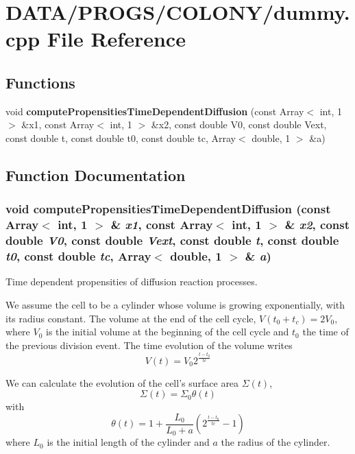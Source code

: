 \section{DATA/PROGS/COLONY/dummy.cpp File Reference}
\label{dummy_8cpp}
\subsection*{Functions}
\begin{CompactItemize}
\item 
void {\bf computePropensitiesTimeDependentDiffusion} (const Array$<$ int, 1 $>$ \&x1, const Array$<$ int, 1 $>$ \&x2, const double V0, const double Vext, const double t, const double t0, const double tc, Array$<$ double, 1 $>$ \&a)
\end{CompactItemize}


\subsection{Function Documentation}
\subsubsection{\setlength{\rightskip}{0pt plus 5cm}void computePropensitiesTimeDependentDiffusion (const Array$<$ int, 1 $>$ \& {\em x1}, \/  const Array$<$ int, 1 $>$ \& {\em x2}, \/  const double {\em V0}, \/  const double {\em Vext}, \/  const double {\em t}, \/  const double {\em t0}, \/  const double {\em tc}, \/  Array$<$ double, 1 $>$ \& {\em a})}\label{dummy_8cpp_8678014f8ffc58d7835b8db6b8ad76d0}




Time dependent propensities of diffusion reaction processes.

We assume the cell to be a cylinder whose volume is growing exponentially, with its radius constant. The volume at the end of the cell cycle, $ V(t_0+t_c) = 2V_0 $, where $ V_0 $ is the initial volume at the beginning of the cell cycle and $ t_0 $ the time of the previous division event. The time evolution of the volume writes \[ V(t) = V_0 2^{\frac{t-t_0}{tc}} \]

We can calculate the evolution of the cell's surface area $ \Sigma(t) $, \[ \Sigma(t) = \Sigma_0 \theta(t) \] with \[ \theta(t) = 1 + \frac{L_0}{L_0+a}\left( 2^{\frac{t-t_0}{tc}}-1 \right) \] where $ L_0 $ is the initial length of the cylinder and $ a $ the radius of the cylinder.

